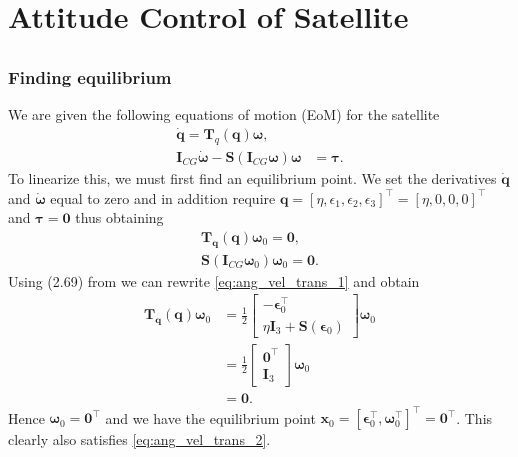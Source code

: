 \section{Attitude Control of Satellite}
\subsection{}
\subsubsection{Finding equilibrium}
We are given the following equations of motion (EoM) for the satellite
\begin{equation}
\label{eq:dynamics}
	\begin{aligned}
		\dot{\mathbf{q}} = \mathbf{T}_q (\mathbf{q} ) \boldsymbol{\omega}, \\
		\mathbf{I}_{CG} \dot{\boldsymbol{\omega}} - \mathbf{S} (\mathbf{I}_{CG} \boldsymbol{\omega} ) \boldsymbol{\omega} & =  \boldsymbol{\tau}.
	\end{aligned}
\end{equation}
To linearize this, we must first find an equilibrium point. We set the derivatives $\dot{\mathbf{q}}$ and $\dot{\boldsymbol{\omega}}$ equal to zero and in addition require $\mathbf{q} = [\eta, \epsilon_1, \epsilon_2, \epsilon_3]^\top  = [\eta, 0, 0, 0]^\top$ and $\boldsymbol{\tau} = \mathbf{0}$ thus obtaining
\begin{align}
\label{eq:ang_vel_trans_1}
\mathbf{T_q}(\mathbf{q})\boldsymbol{\omega}_0 = \mathbf{0}, \\
\label{eq:ang_vel_trans_2}
\mathbf{S}(\mathbf{I}_{CG} \boldsymbol{\omega}_0)\boldsymbol{\omega}_0 = \mathbf{0}.
\end{align}
Using (2.69) from \cite{Fossen2011} we can rewrite \eqref{eq:ang_vel_trans_1} and obtain
\begin{equation}\begin{aligned}
\mathbf{T_q}(\mathbf{q})\boldsymbol{\omega}_0
&= \frac{1}{2}
\begin{bmatrix}
- \boldsymbol{\epsilon}_0^\top \\
\eta \mathbf{I}_3 + \mathbf{S}(\boldsymbol{\epsilon}_0)
\end{bmatrix}
\boldsymbol{\omega}_0 \\
&= \frac{1}{2}
\begin{bmatrix}
\mathbf{0}^\top \\
\mathbf{I}_3
\end{bmatrix}
\boldsymbol{\omega}_0 \\
&= \mathbf{0}.
\end{aligned}\end{equation}
Hence $\boldsymbol{\omega}_0 = \mathbf{0}^\top$ and we have the equilibrium point $\mathbf{x}_0 = [\boldsymbol{\epsilon}_0^\top, \boldsymbol{\omega}_0^\top]^\top = \mathbf{0}^\top$. This clearly also satisfies \eqref{eq:ang_vel_trans_2}.
